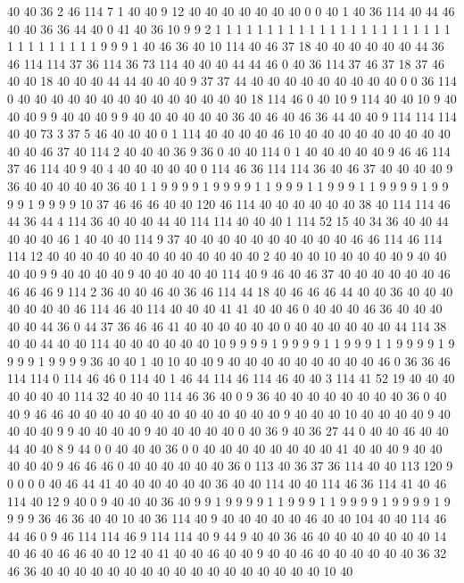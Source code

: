 40 40 36 2 46 114 7 1 40 40 9 12 40 40 40 40 40 40 40 0
0 40 1 40 36 114 40 44 46 40 40 36 36 44 40 0 41 40 36 10
9 9 2 1 1 1 1 1 1 1 1 1 1 1 1 1 1 1 1 1
1 1 1 1 1 1 1 1 1 1 1 1 1 1 1 9 9 9 1 40
46 36 40 10 114 40 46 37 18 40 40 40 40 40 40 44 36 46 114 114
37 36 114 36 73 114 40 40 40 44 44 46 0 40 36 114 37 46 37 18
37 46 40 40 18 40 40 40 44 44 40 40 40 9 37 37 44 40 40 40
40 40 40 40 40 40 0 0 36 114 0 40 40 40 40 40 40 40 40 40
40 40 40 40 40 18 114 46 0 40 10 9 114 40 40 10 9 40 40 40
9 9 40 40 40 9 9 40 40 40 40 40 40 36 40 46 40 46 36 44
40 40 9 114 114 114 40 40 73 3 37 5 46 40 40 40 0 1 114 40
40 40 40 46 10 40 40 40 40 40 40 40 40 40 40 40 46 37 40 114
2 40 40 40 36 9 36 0 40 40 114 0 1 40 40 40 40 40 9 46
46 114 37 46 114 40 9 40 4 40 40 40 40 40 0 114 46 36 114 114
36 40 46 37 40 40 40 40 9 36 40 40 40 40 40 36 40 1 1 9
9 9 9 1 9 9 9 9 1 1 9 9 9 1 1 9 9 9 1 1
9 9 9 9 1 9 9 9 9 1 9 9 9 9 10 37 46 46 46 40
40 120 46 114 40 40 40 40 40 40 38 40 114 114 46 44 36 44 4 114
36 40 40 40 44 40 114 114 40 40 40 1 114 52 15 40 34 36 40 40
44 40 40 40 46 1 40 40 40 114 9 37 40 40 40 40 40 40 40 40
40 40 46 46 114 46 114 114 12 40 40 40 40 40 40 40 40 40 40 40
40 40 2 40 40 40 10 40 40 40 40 9 40 40 40 40 9 9 40 40
40 40 9 40 40 40 40 40 114 40 9 46 40 46 37 40 40 40 40 40
40 46 46 46 46 9 114 2 36 40 40 46 40 36 46 114 44 18 40 46
46 46 44 40 40 36 40 40 40 40 40 40 40 46 114 46 40 114 40 40
40 41 41 40 40 46 0 40 40 40 46 36 40 40 40 40 40 44 36 0
44 37 36 46 46 41 40 40 40 40 40 40 0 40 40 40 40 40 40 44
114 38 40 40 44 40 40 114 40 40 40 40 40 40 10 9 9 9 9 1
9 9 9 9 1 1 9 9 9 1 1 9 9 9 9 1 9 9 9 9
1 9 9 9 9 36 40 40 1 40 10 40 40 9 40 40 40 40 40 40
40 40 40 46 0 36 36 46 114 114 0 114 46 46 0 114 40 1 46 44
114 46 114 46 40 40 3 114 41 52 19 40 40 40 40 40 40 40 114 32
40 40 40 114 46 36 40 0 9 36 40 40 40 40 40 40 40 40 36 0
40 40 9 46 46 40 40 40 40 40 40 40 40 40 40 40 40 40 9 40
40 40 10 40 40 40 40 9 40 40 40 40 9 9 40 40 40 40 9 40
40 40 40 40 0 40 36 9 40 36 27 44 0 40 40 46 40 40 44 40
40 8 9 44 0 0 40 40 40 36 0 0 40 40 40 40 40 40 40 40
41 40 40 40 9 40 40 40 40 40 9 46 46 46 0 40 40 40 40 40
40 36 0 113 40 36 37 36 114 40 40 113 120 9 0 0 0 0 40 46
44 41 40 40 40 40 40 40 36 40 40 114 40 40 114 46 36 114 41 40
46 114 40 12 9 40 0 9 40 40 40 36 40 9 9 1 9 9 9 9
1 1 9 9 9 1 1 9 9 9 9 1 9 9 9 9 1 9 9 9
9 36 46 36 40 40 10 40 36 114 40 9 40 40 40 40 40 46 40 40
104 40 40 114 46 44 46 0 9 46 114 114 46 9 114 114 40 9 44 9
40 40 36 46 40 40 40 40 40 40 40 14 40 46 40 46 46 40 40 12
40 41 40 40 46 40 40 9 40 40 46 40 40 40 40 40 40 36 32 46
36 40 40 40 40 40 40 40 40 40 40 40 40 40 40 40 40 40 10 40
